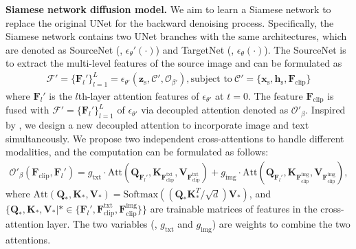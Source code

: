 \textbf{Siamese network diffusion model.} We aim to learn a Siamese network to replace the original UNet for the backward denoising process. 
%
Specifically, the Siamese network contains two UNet branches with the same architectures, which are denoted as SourceNet (\ie, $\epsilon_\theta'(\cdot)$) and TargetNet (\ie, $\epsilon_\theta(\cdot)$). The SourceNet is to extract the multi-level features of the source image and can be formulated as
%
\begin{align} \label{eq:sourcenet}
    \mathcal{F}' = \{\mathbf{F}_l'\}_{l=1}^L = \epsilon_{\theta'}(\mathbf{z}_\text{s},\mathcal{C}', 
    \mathcal{O}_{\beta'}), \text{subject to}~\mathcal{C}'=\{\mathbf{x}_\text{s},\mathbf{h}_\text{s},\mathbf{F}_\text{clip}\}
\end{align}
%
where $\mathbf{F}_l'$ is the $l$th-layer attention features of $ \epsilon_{\theta'}$ at $t=0$. 
%
The feature $\mathbf{F}_\text{clip}$ is fused with $\mathcal{F}' = \{\mathbf{F}_l'\}_{l=1}^L$ of $\epsilon_{\theta'}$ via decoupled attention denoted as $\mathcal{O}'_\beta$. 
%
Inspired by \cite{ye2023ip}, we design a new decoupled attention to incorporate image and text simultaneously. 
%
We propose two independent cross-attentions to handle different modalities, and the computation can be formulated as follows:
%
\begin{align} \label{eq:decoupled_attention}
\mathcal{O}'_\beta (\mathbf{F}_\text{clip},\mathbf{F}_l') = g_\text{txt} \cdot \text{Att}(\textbf{Q}_{\mathbf{F}_l'},\textbf{K}_{\mathbf{F}_\text{clip}^\text{txt}},\textbf{V}_{\mathbf{F}_\text{clip}^\text{txt}}) + g_\text{img} \cdot \text{Att}(\textbf{Q}_{\mathbf{F}_l'}, \textbf{K}_{\mathbf{F}_\text{clip}^\text{img}},\textbf{V}_{\mathbf{F}_\text{clip}^\text{img}}),
\end{align}
%
where $\text{Att}(\textbf{Q}_*,\textbf{K}_*,\textbf{V}_*)=\text{Softmax}\left(({\textbf{Q}_* \textbf{K}_*^{T}}/{\sqrt{d}})\textbf{V}_*\right)$, and $\{\mathbf{Q}_*,\mathbf{K}_*,\mathbf{V}_* | * \in \{ \mathbf{F}_l', \mathbf{F}_\text{clip}^\text{txt},  \mathbf{F}_\text{clip}^\text{img}\} \}$ are trainable matrices of features in the cross-attention layer. The two variables (\ie, $g_\text{txt}$ and $g_\text{img}$) are weights to combine the two attentions.


